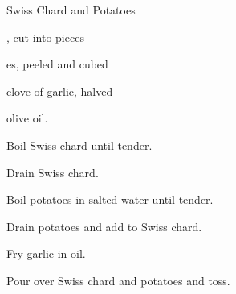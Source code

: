 \begin{recipe}{Swiss Chard and Potatoes}{}{}

\begin{ingredients}
\item {}, cut into pieces
\item {}es, peeled and cubed
\item clove of garlic, halved
\item olive oil.
\end{ingredients}

\begin{directions}
\item Boil Swiss chard until tender.
\item Drain Swiss chard.
\item Boil potatoes in salted water until tender.
\item Drain potatoes and add to Swiss chard.
\item Fry garlic in oil.
\item Pour over Swiss chard and potatoes and toss.
\end{directions}

\end{recipe}
